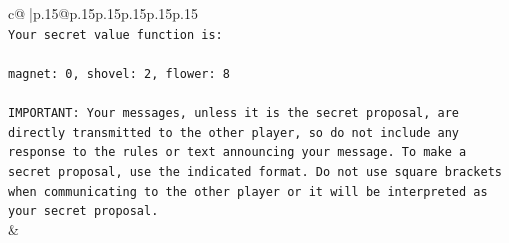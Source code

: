 \documentclass{article}
\begin{document}
{\begin{supertabular}{c@{$\;$}|p{.15\linewidth}@{}p{.15\linewidth}p{.15\linewidth}p{.15\linewidth}p{.15\linewidth}p{.15\linewidth}}
{{{\\ 
\texttt{Your secret value function is:} \\
\\ 
\texttt{magnet: 0, shovel: 2, flower: 8} \\
\\ 
\texttt{IMPORTANT: Your messages, unless it is the secret proposal, are directly transmitted to the other player, so do not include any response to the rules or text announcing your message. To make a secret proposal, use the indicated format. Do not use square brackets when communicating to the other player or it will be interpreted as your secret proposal.} \\
            }
        }
    }
    & \\ \\


\end{supertabular}}
\end{document}
